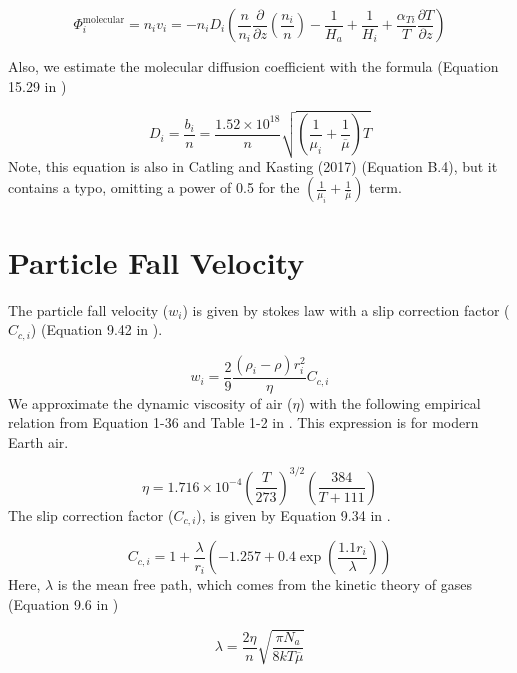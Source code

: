 \documentclass{article}
\begin{document}
\begin{equation} \label{eq:phi_molec_diffusion}
  \Phi_i^\text{molecular} = n_i v_i = -n_i D_{i} \left( \frac{n}{n_i} \frac{\partial}{\partial z} \left(\frac{n_i}{n}\right) - \frac{1}{H_a} + \frac{1}{H_i} + \frac{\alpha_{Ti}}{T} \frac{\partial T}{\partial z} \right)
\end{equation}

Also, we estimate the molecular diffusion coefficient with the formula (Equation 15.29 in \cite{Banks_2013})

\begin{equation} \label{eq:molec_diffusion_coeff}
  D_i = 
  \frac{b_i}{n} = \frac{1.52 \times 10^{18}}{n} \sqrt{\left( \frac{1}{\mu_i} + \frac{1}{\overline{\mu}} \right) T}
\end{equation}
Note, this equation is also in Catling and Kasting (2017) \cite{Catling_2017} (Equation B.4), but it contains a typo, omitting a power of 0.5 for the $\left( \frac{1}{\mu_i} + \frac{1}{\overline{\mu}} \right)$ term.

\section{Particle Fall Velocity} \label{sec:fall_velocity}

The particle fall velocity ($w_i$) is given by stokes law with a slip correction factor ($C_{c,i}$) (Equation 9.42 in \cite{Seinfeld_2006}).

\begin{equation} \label{eq:stokes_law}
  w_i = \frac{2}{9} \frac{(\rho_i - \rho)r_i^2}{\eta} C_{c,i}
\end{equation}
We approximate the dynamic viscosity of air ($\eta$) with the following empirical relation from Equation 1-36 and Table 1-2 in \cite{White_2006}. This expression is for modern Earth air.

\begin{equation} \label{eq:dynamic_viscosity}
  \eta = 1.716 \times 10^{-4} \left(\frac{T}{273}\right)^{3/2} \left( \frac{384}{T + 111} \right)
\end{equation}
The slip correction factor ($C_{c,i}$), is given by Equation 9.34 in \cite{Seinfeld_2006}.

\begin{equation} \label{eq:slip_correction}
  C_{c,i} = 1 + \frac{\lambda}{r_i}\left( -1.257 + 0.4 \exp \left(\frac{1.1 r_i}{\lambda}\right) \right)
\end{equation}
Here, $\lambda$ is the mean free path, which comes from the kinetic theory of gases (Equation 9.6 in \cite{Seinfeld_2006})

\begin{equation}
  \lambda = \frac{2 \eta}{n} \sqrt{\frac{\pi N_a}{8 k T \overline{\mu}}}
\end{equation}





\end{document}
